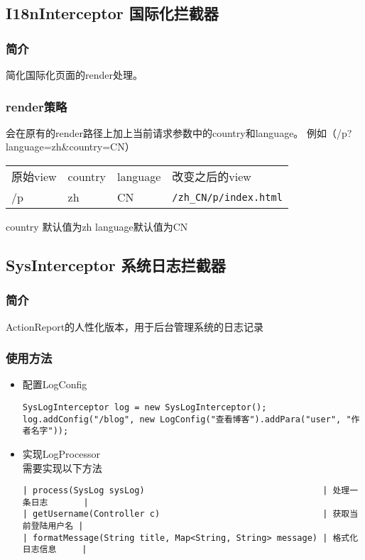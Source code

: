 \documentclass{scrartcl}
\begin{document}
\subsection{I18nInterceptor 国际化拦截器}
\label{sec-5-2}
\subsubsection{简介}
\label{sec-5-2-1}

    简化国际化页面的render处理。
\subsubsection{render策略}
\label{sec-5-2-2}

   会在原有的render路径上加上当前请求参数中的country和language。
   例如（/p?language=zh\&country=CN）

\begin{tabular}{llll}
 原始view  &  country  &  language  &  改变之后的view                 \\
 /p        &  zh       &  CN        &  \texttt{/zh\_CN/p/index.html}  \\
\end{tabular}



country 默认值为zh language默认值为CN
\subsection{SysInterceptor 系统日志拦截器}
\label{sec-5-3}
\subsubsection{简介}
\label{sec-5-3-1}

 ActionReport的人性化版本，用于后台管理系统的日志记录
\subsubsection{使用方法}
\label{sec-5-3-2}
\begin{itemize}

\item 配置LogConfig\\
\label{sec-5-3-2-1}%
\begin{verbatim}
SysLogInterceptor log = new SysLogInterceptor();
log.addConfig("/blog", new LogConfig("查看博客").addPara("user", "作者名字"));
\end{verbatim}

\item 实现LogProcessor\\
\label{sec-5-3-2-2}%
需要实现以下方法

\begin{verbatim}
| process(SysLog sysLog)                                   | 处理一条日志       |
| getUsername(Controller c)                                | 获取当前登陆用户名 |
| formatMessage(String title, Map<String, String> message) | 格式化日志信息     |
\end{verbatim}
\end{itemize} %
\end{document}
